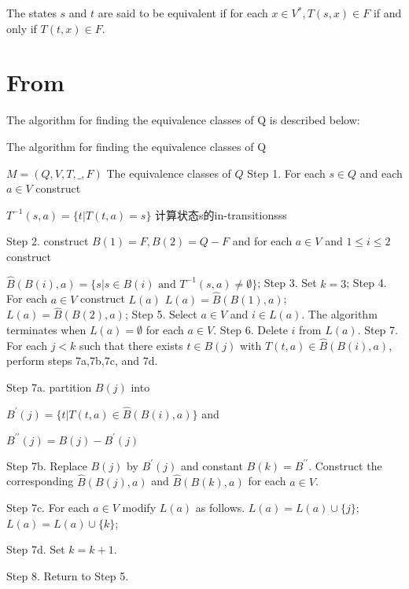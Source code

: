 \begin{definition}
	The states $s$ and $t$ are said to be equivalent if for each $x\in V^\ast, T(s,x)\in F$ if and only if $T(t,x)\in F$. 
\end{definition}

\section{From \cite{Hopcroft71}}

The algorithm for finding the equivalence classes of Q is described below:

\begin{algorithm}  
	\caption{The algorithm for finding the equivalence classes of Q}  
	\begin{algorithmic}%
		\Require $M=(Q,V,T,\_,F)$  
		\Ensure The equivalence classes of $Q$  
		\State Step 1. For each $s\in Q$ and each $a\in V$ construct
		
		$T^{-1}(s,a)=\{t|T(t,a)=s\}$ \qquad 计算状态s的in-transitionsss
		
		\State Step 2. construct $B(1)=F, B(2)=Q-F$ and for each $a\in V$ and $1\le i\le 2$ construct
		
				\State $\hat{B}(B(i),a)=\{s|s\in B(i) \text{ and } T^{-1}(s,a)\ne \emptyset\}$;
			\EndFor  
		\EndFor 
		\State Step 3. Set $k=3$;
		\State Step 4. For each $a\in V$ construct $L(a)$
				\State $L(a) = \hat{B}(B(1),a)$;
			\Else
	            \State $L(a) = \hat{B}(B(2),a)$; 
			\EndIf
		\EndFor
		\State Step 5. Select $a\in V$ and $i\in L(a)$. The algorithm terminates when $L(a)=\emptyset$ for each $a\in V$.
		\State Step 6. Delete $i$ from $L(a)$.
		\State Step 7. For each $j<k$ such that there exists $t\in B(j)$ with $T(t,a)\in \hat{B}(B(i),a)$, perform steps 7a,7b,7c, and 7d.
		
		\State Step 7a. partition $B(j)$ into
			
			$B^\prime(j)=\{t|T(t,a)\in \hat{B}(B(i),a)\}$ and			
		
			$B^{\prime\prime}(j)=B(j)-B^\prime(j)$
		
		\State Step 7b. Replace $B(j)$ by $B^\prime(j)$ and constant $B(k)=B^{\prime\prime}$. Construct the corresponding $\hat{B}(B(j),a)$ and $\hat{B}(B(k),a)$ for each $a\in V$.
		
		\State Step 7c. For each $a\in V$ modify $L(a)$ as follows.
				\State $L(a) = L(a)\cup \{j\}$;
			\Else
				\State $L(a) = L(a)\cup \{k\}$;
			\EndIf 
			
		\State Step 7d. Set $k=k+1$.
		
		\State Step 8. Return to Step 5.
	\end{algorithmic}   
\end{algorithm}

